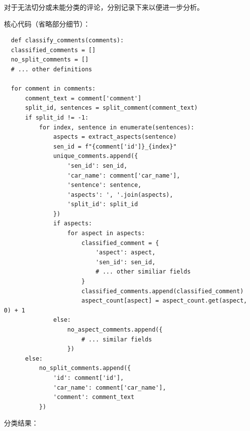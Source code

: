 \documentclass[UTF8,a4paper,15pt,titlepage,oneside]{ctexbook}
\begin{document}
对于无法切分或未能分类的评论，分别记录下来以便进一步分析。

核心代码（省略部分细节）：

\begin{mdframed}[backgroundcolor=darkgray, linecolor=lightgray, linewidth=1pt, innermargin=0.5cm, outermargin=0.5cm, skipbelow=0.1cm]
  \color{white}
  \begin{verbatim}
  def classify_comments(comments):
  classified_comments = []
  no_split_comments = []
  # ... other definitions

  for comment in comments:
      comment_text = comment['comment']
      split_id, sentences = split_comment(comment_text)
      if split_id != -1:
          for index, sentence in enumerate(sentences):
              aspects = extract_aspects(sentence)
              sen_id = f"{comment['id']}_{index}"
              unique_comments.append({
                  'sen_id': sen_id,
                  'car_name': comment['car_name'],
                  'sentence': sentence,
                  'aspects': ', '.join(aspects),
                  'split_id': split_id
              })
              if aspects:
                  for aspect in aspects:
                      classified_comment = {
                          'aspect': aspect,
                          'sen_id': sen_id,
                          # ... other similiar fields
                      }
                      classified_comments.append(classified_comment)
                      aspect_count[aspect] = aspect_count.get(aspect, 0) + 1
              else:
                  no_aspect_comments.append({
                      # ... similar fields
                  })
      else:
          no_split_comments.append({
              'id': comment['id'],
              'car_name': comment['car_name'],
              'comment': comment_text
          })
    \end{verbatim}
\vspace{-1.5em} %
\end{mdframed}

分类结果：
\end{document}
